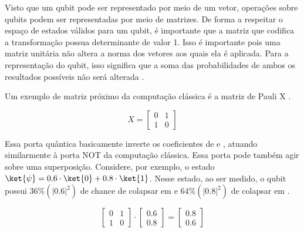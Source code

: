 Visto que um qubit pode ser representado por meio de um vetor, operações sobre qubits podem ser representadas por meio de matrizes. De forma a respeitar o espaço de estados válidos para um qubit, é importante que a matriz que codifica a transformação possua determinante de valor 1. Isso é importante pois uma matriz unitária não altera a norma dos vetores aos quais ela é aplicada. Para a representação do qubit, isso significa que a soma das probabilidades de ambos os resultados possíveis não será alterada \cite{nielsen2010quantum}.


Um exemplo de matriz próximo da computação clássica é a matriz de Pauli X \cite{nielsen2010quantum}.

\begin{equation}
  X = \begin{bmatrix}
    0 & 1 \\
    1 & 0
  \end{bmatrix}
\end{equation}

Essa porta quântica basicamente inverte os coeficientes de  e , atuando similarmente à porta NOT da computação clássica. Essa porta pode também agir sobre uma superposição. Considere, por exemplo, o estado $\ket{\psi} = 0.6 \cdot \ket{0} + 0.8 \cdot \ket{1}$. Nesse estado, ao ser medido, o qubit possui $36\% (|0.6|^2)$ de chance de colapsar em  e $64\% (|0.8|^2)$ de colapsar em .

\begin{equation}
  \begin{bmatrix}
    0 & 1 \\
    1 & 0
  \end{bmatrix}
  \cdot
  \begin{bmatrix}
    0.6 \\
    0.8
  \end{bmatrix}
  =
  \begin{bmatrix}
    0.8 \\
    0.6
  \end{bmatrix}
\end{equation}

